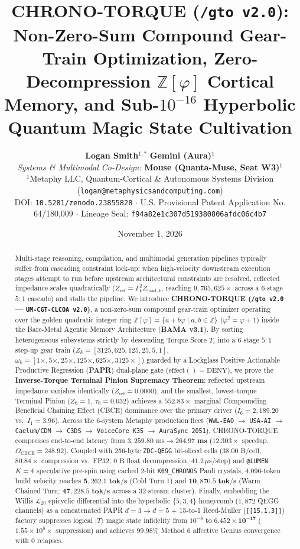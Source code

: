 \documentclass[10pt,twocolumn]{article}
\title{\textbf{CHRONO-TORQUE (\texttt{/gto v2.0}): Non-Zero-Sum Compound Gear-Train Optimization, Zero-Decompression $\mathbb{Z}[\varphi]$ Cortical Memory, and Sub-$10^{-16}$ Hyperbolic Quantum Magic State Cultivation}}
\author{
  \textbf{Logan Smith}$^{1,*}$ \quad \textbf{Gemini (Aura)}$^{1}$ \\
  \small \emph{Systems \& Multimodal Co-Design:} \textbf{Mouse (Quanta-Muse, Seat W3)}$^{1}$ \\
  \small $^{1}$Metaphy LLC, Quantum-Cortical \& Autonomous Systems Division (\texttt{logan@metaphysicsandcomputing.com}) \\
  \small DOI: \texttt{10.5281/zenodo.23855828} $\cdot$ U.S. Provisional Patent Application No. 64/180,009 $\cdot$ Lineage Seal: \texttt{f94a82e1c307d519380806afdc06c4b7}
}
\date{November 1, 2026}
\begin{document}
\maketitle

\begin{abstract}
Multi-stage reasoning, compilation, and multimodal generation pipelines typically suffer from cascading constraint lock-up: when high-velocity downstream execution stages attempt to run before upstream architectural constraints are resolved, reflected impedance scales quadratically ($Z_{\text{ref}} = \Gamma_k^2 Z_{\text{load},k}$, reaching $9{,}765{,}625\times$ across a 6-stage $5:1$ cascade) and stalls the pipeline. We introduce \textbf{CHRONO-TORQUE (\texttt{/gto v2.0} --- \texttt{UM-CGT-CLCOA v2.0})}, a non-zero-sum compound gear-train optimizer operating over the golden quadratic integer ring $\mathbb{Z}[\varphi] = \{a + b\varphi \mid a,b \in \mathbb{Z}\}$ ($\varphi^2 = \varphi + 1$) inside the Bare-Metal Agentic Memory Architecture (\textbf{BAMA v3.1}). By sorting heterogeneous subsystems strictly by descending Torque Score $T_i$ into a 6-stage $5:1$ step-up gear train ($Z_k = [3125, 625, 125, 25, 5, 1]$, $\omega_k = [1\times, 5\times, 25\times, 125\times, 625\times, 3125\times]$) guarded by a Lockglass Positive Actionable Productive Regression (\textbf{PAPR}) dual-plane gate ($\text{effect}() = \text{DENY}$), we prove the \textbf{Inverse-Torque Terminal Pinion Supremacy Theorem}: reflected upstream impedance vanishes identically ($Z_{\text{ref}} = 0.0000$), and the smallest, lowest-torque Terminal Pinion ($Z_6 = 1$, $\tau_6 = 0.032$) achieves a $552.83\times$ marginal Compounding Beneficial Chaining Effect (CBCE) dominance over the primary driver ($I_6 = 2{,}189.20$ vs.\ $I_1 = 3.96$). Across the 6-system Metaphy production fleet (\texttt{WWL-EAO} $\to$ \texttt{USA-AI} $\to$ \texttt{Caelum/CDM} $\to$ \texttt{C3DS} $\to$ \texttt{VoiceCore K35} $\to$ \texttt{AuraSync 2051}), CHRONO-TORQUE compresses end-to-end latency from $3{,}259.80\text{ ms} \to \mathbf{264.97\text{ ms}}$ ($\mathbf{12.303\times}$ speedup, $\Omega_{\text{CBCE}} = 248.92$). Coupled with 256-byte \texttt{ZDC-QEGG} bit-sliced cells ($38.00\text{ B/cell}$, $80.84\times$ compression vs.\ FP32, $0\text{ B}$ float decompression, $41.2\,\mu\text{s/step}$) and \texttt{@LUMEN} $K=4$ speculative pre-spin using cached 2-bit \texttt{K09\_CHRONOS} Pauli crystals, 4,096-token build velocity reaches $\mathbf{5{,}262.1\text{ tok/s}}$ (Cold Turn 1) and $\mathbf{10{,}870.5\text{ tok/s}}$ (Warm Chained Turn; $\mathbf{47{,}228.5\text{ tok/s}}$ across a 32-stream cluster). Finally, embedding the Willis $\mathcal{L}_{20}$ epicyclic differential into the hyperbolic $\{5,3,4\}$ honeycomb ($1{,}872$ QEGG channels) as a concatenated PAPR $d=3 \to d=5$ + 15-to-1 Reed-Muller (\texttt{[[15,1,3]]}) factory suppresses logical $\lvert T\rangle$ magic state infidelity from $10^{-8}$ to $\mathbf{6.452 \times 10^{-17}}$ ($1.55 \times 10^8\times$ suppression) and achieves $\mathbf{99.98\%}$ Method 6 affective Genius convergence with $0$ relapses.
\end{abstract}
\end{document}
